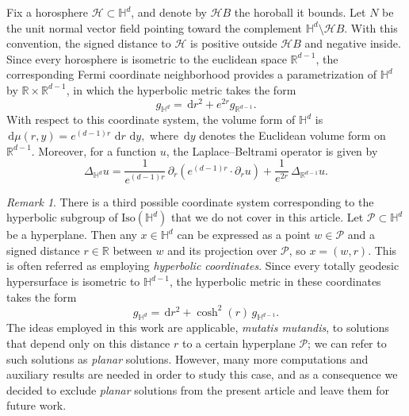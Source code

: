 \documentclass[12pt,longbibliography]{article}
\def\R{\mathbb{R}}
\def\d{\,\mathrm{d}}
\def\R{\mathbb{R}}
\def\d{\,\mathrm{d}}
\def\H{\mathbb{H}}
\theoremstyle{definition}
\theoremstyle{remark}
\newtheorem{rem}[thm]{Remark}
\theoremstyle{example}
\begin{document}
Fix a horosphere \(\mathcal{H} \subset \mathbb{H}^d\), and denote by \(\mathcal{H}B\) 
the horoball it bounds. Let \(N\) be the unit normal vector field pointing toward 
the complement \(\mathbb{H}^d \setminus \mathcal{H}B\). With this convention, 
the signed distance to \(\mathcal{H}\) is positive outside \(\mathcal{H}B\) 
and negative inside. Since every horosphere is isometric to the euclidean space 
\(\mathbb{R}^{d-1}\), the corresponding Fermi coordinate neighborhood provides 
a parametrization of \(\mathbb{H}^d\) by \(\mathbb{R} \times \mathbb{R}^{d-1}\), 
in which the hyperbolic metric takes the form 
\[
g_{\mathbb{H}^d}= \d r^2 + e^{2 r} g_{\mathbb{R}^{d-1}}.
\]
With respect to this coordinate system, the volume form of \(\mathbb{H}^d\) is $\d\mu(r,y) = e^{(d-1)r} \, \d r \, \d y,$ where \(\d y\) denotes the Euclidean volume form on \(\mathbb{R}^{d-1}\). Moreover, 
for a function \(u\), the Laplace--Beltrami operator is given by  
\begin{equation}\label{laplacianParabolic}
	\Delta_{\mathbb{H}^d} u 
	= \frac{1}{e^{(d-1)r}} \, \partial_r \!\left(e^{(d-1)r} \cdot \partial_r u\right) 
	+ \frac{1}{e^{2r}} \, \Delta_{\mathbb{R}^{d-1}} u.
\end{equation}

\begin{rem}
	There is a third possible coordinate system corresponding to the hyperbolic subgroup of $\text{Iso}(\H^d)$ that we do not cover in this article. Let $\mathcal{P}\subset\H^d$ be a hyperplane. Then any $x\in \H^d$ can be expressed as a point $w\in \mathcal{P}$ and a signed distance $r\in\R$ between $w$ and its projection over $\mathcal{P}$, so $x=(w, r)$. This is often referred as employing \textit{hyperbolic coordinates}. Since every totally geodesic hypersurface is isometric to \(\mathbb{H}^{d-1}\), the hyperbolic metric in these coordinates takes the form  
	\[
	g_{\mathbb{H}^d} = \d r^2 + \cosh^2(r)\, g_{\mathbb{H}^{d-1}}.
	\]
	The ideas employed in this work are applicable, \textit{mutatis mutandis}, to solutions that depend only on this distance $r$ to a certain hyperplane $\mathcal{P}$; we can refer to such solutions as \textit{planar} solutions. However, many more computations and auxiliary results are needed in order to study this case, and as a consequence we decided to exclude \textit{planar} solutions from the present article and leave them for future work.
\end{rem}
\end{document}
